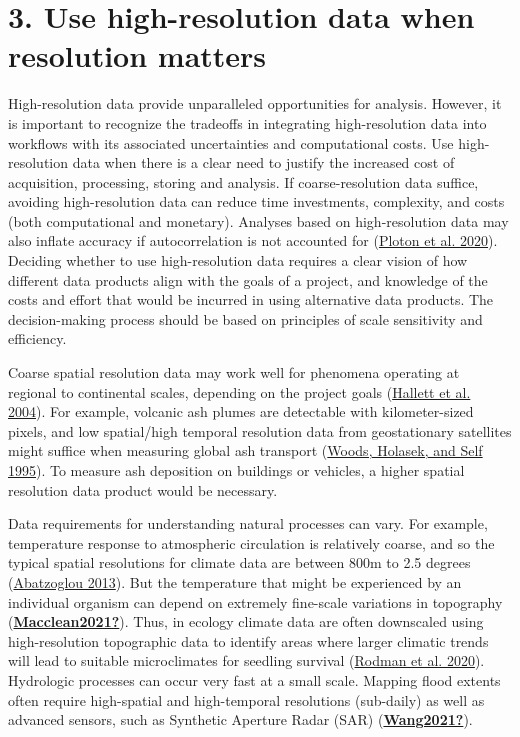 \documentclass[
  12pt,
]{article}
\begin{document}
\hypertarget{use-high-resolution-data-when-resolution-matters}{%
\section{3. Use high-resolution data when resolution
matters}\label{use-high-resolution-data-when-resolution-matters}}

High-resolution data provide unparalleled opportunities for analysis.
However, it is important to recognize the tradeoffs in integrating
high-resolution data into workflows with its associated uncertainties
and computational costs. Use high-resolution data when there is a clear
need to justify the increased cost of acquisition, processing, storing
and analysis. If coarse-resolution data suffice, avoiding
high-resolution data can reduce time investments, complexity, and costs
(both computational and monetary). Analyses based on high-resolution
data may also inflate accuracy if autocorrelation is not accounted for
(\protect\hyperlink{ref-ploton2020spatial}{Ploton et al. 2020}).
Deciding whether to use high-resolution data requires a clear vision of
how different data products align with the goals of a project, and
knowledge of the costs and effort that would be incurred in using
alternative data products. The decision-making process should be based
on principles of scale sensitivity and efficiency.

Coarse spatial resolution data may work well for phenomena operating at
regional to continental scales, depending on the project goals
(\protect\hyperlink{ref-hallett2004}{Hallett et al. 2004}). For example,
volcanic ash plumes are detectable with kilometer-sized pixels, and low
spatial/high temporal resolution data from geostationary satellites
might suffice when measuring global ash transport
(\protect\hyperlink{ref-woods1995wind}{Woods, Holasek, and Self 1995}).
To measure ash deposition on buildings or vehicles, a higher spatial
resolution data product would be necessary.

Data requirements for understanding natural processes can vary. For
example, temperature response to atmospheric circulation is relatively
coarse, and so the typical spatial resolutions for climate data are
between 800m to 2.5 degrees
(\protect\hyperlink{ref-abatzoglou2013}{Abatzoglou 2013}). But the
temperature that might be experienced by an individual organism can
depend on extremely fine-scale variations in topography
(\protect\hyperlink{ref-Macclean2021}{\textbf{Macclean2021?}}). Thus, in
ecology climate data are often downscaled using high-resolution
topographic data to identify areas where larger climatic trends will
lead to suitable microclimates for seedling survival
(\protect\hyperlink{ref-rodman2020}{Rodman et al. 2020}). Hydrologic
processes can occur very fast at a small scale. Mapping flood extents
often require high-spatial and high-temporal resolutions (sub-daily) as
well as advanced sensors, such as Synthetic Aperture Radar (SAR)
(\protect\hyperlink{ref-Wang2021}{\textbf{Wang2021?}}).
\end{document}

